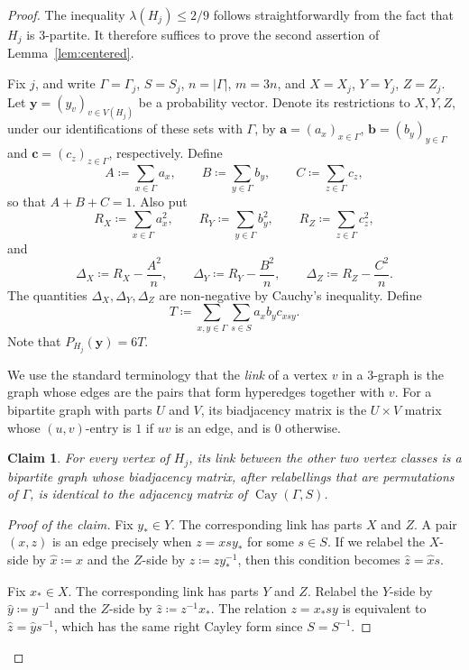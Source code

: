 \documentclass[10pt]{article}
\numberwithin{equation}{section}
\newtheorem{claim}[theorem]{Claim}
\DeclareMathOperator{\Cay}{Cay}
\begin{document}
\begin{proof}
The inequality $\lambda(H_j)\le 2/9$ follows straightforwardly from the fact that $H_j$ is $3$-partite. It therefore suffices to prove the second assertion of Lemma~\ref{lem:centered}.

	Fix $j$, and write $\Gamma=\Gamma_j$, $S=S_j$, $n=|\Gamma|$, $m=3n$, and $X=X_j$, $Y=Y_j$, $Z=Z_j$. Let $\mathbf{y}=(y_v)_{v\in V(H_j)}$ be a probability vector. Denote its restrictions to $X,Y,Z$, under our identifications of these sets with $\Gamma$, by $\mathbf{a}=(a_x)_{x\in\Gamma}$, $\mathbf{b}=(b_y)_{y\in\Gamma}$ and $\mathbf{c}=(c_z)_{z\in\Gamma}$, respectively.
Define
\[
        A\coloneqq \sum_{x\in\Gamma}a_x, \qquad B\coloneqq \sum_{y\in\Gamma}b_y, \qquad C\coloneqq \sum_{z\in\Gamma}c_z,
\]
so that $A+B+C=1$. Also put
\[
        R_X\coloneqq \sum_{x\in\Gamma} a_x^2, \qquad R_Y\coloneqq \sum_{y\in\Gamma} b_y^2, \qquad R_Z\coloneqq \sum_{z\in\Gamma} c_z^2,
\]
and
\[
        \Delta_X\coloneqq R_X-\frac{A^2}{n}, \qquad \Delta_Y\coloneqq R_Y-\frac{B^2}{n}, \qquad \Delta_Z\coloneqq R_Z-\frac{C^2}{n}.
\]
The quantities $\Delta_X,\Delta_Y,\Delta_Z$ are non-negative by Cauchy's inequality.
Define 
\[
        T
        \coloneqq \sum_{x,y\in\Gamma}\sum_{s\in S}a_xb_yc_{xsy} .
\]
Note that $P_{H_j}(\mathbf{y})=6T$.

We use the standard terminology that the \emph{link} of a vertex $v$ in a $3$-graph is the graph whose edges are the pairs that form hyperedges together with $v$. For a bipartite graph with parts $U$ and $V$, its biadjacency matrix is the $U\times V$ matrix whose $(u,v)$-entry is $1$ if $uv$ is an edge, and is $0$ otherwise. 

\begin{claim}\label{clm:link-relabel}
For every vertex of $H_j$, its link between the other two vertex classes is a bipartite graph whose biadjacency matrix, after relabellings that are permutations of $\Gamma$, is identical to the adjacency matrix of $\Cay(\Gamma,S)$.
\end{claim}

\begin{proof}[Proof of the claim]
Fix $y_\ast\in Y$. The corresponding link has parts $X$ and $Z$. A pair $(x,z)$ is an edge precisely when $z=xsy_\ast$ for some $s\in S$. If we relabel the $X$-side by $\hat{x}\coloneqq x$ and the $Z$-side by $\hat{z}\coloneqq zy_\ast^{-1}$, then this condition becomes $\hat{z}=\hat{x}s$.

Fix $x_\ast\in X$. The corresponding link has parts $Y$ and $Z$. Relabel the $Y$-side by $\hat{y}\coloneqq y^{-1}$ and the $Z$-side by $\hat{z}\coloneqq z^{-1}x_\ast$. The relation $z=x_\ast sy$ is equivalent to $\hat{z}=\hat{y}s^{-1}$, which has the same right Cayley form since $S=S^{-1}$.


\end{proof}
\end{proof}
\end{document}
